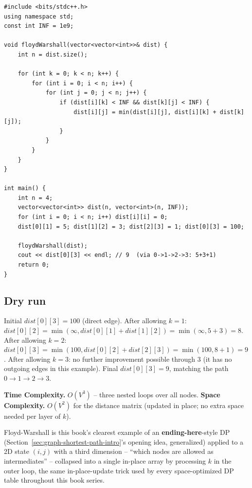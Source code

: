 \begin{lstlisting}
#include <bits/stdc++.h>
using namespace std;
const int INF = 1e9;

void floydWarshall(vector<vector<int>>& dist) {
    int n = dist.size();

    for (int k = 0; k < n; k++) {
        for (int i = 0; i < n; i++) {
            for (int j = 0; j < n; j++) {
                if (dist[i][k] < INF && dist[k][j] < INF) {
                    dist[i][j] = min(dist[i][j], dist[i][k] + dist[k][j]);
                }
            }
        }
    }
}

int main() {
    int n = 4;
    vector<vector<int>> dist(n, vector<int>(n, INF));
    for (int i = 0; i < n; i++) dist[i][i] = 0;
    dist[0][1] = 5; dist[1][2] = 3; dist[2][3] = 1; dist[0][3] = 100;

    floydWarshall(dist);
    cout << dist[0][3] << endl; // 9  (via 0->1->2->3: 5+3+1)
    return 0;
}
\end{lstlisting}

\subsection*{Dry run}


Initial $\textit{dist}[0][3]=100$ (direct edge). After allowing $k=1$:
$\textit{dist}[0][2] = \min(\infty, \textit{dist}[0][1]+\textit{dist}[1][2]) =
\min(\infty,5+3)=8$. After allowing $k=2$: $\textit{dist}[0][3] =
\min(100, \textit{dist}[0][2]+\textit{dist}[2][3]) = \min(100,8+1)=9$.
After allowing $k=3$: no further improvement possible through $3$
(it has no outgoing edges in this example). Final
$\textit{dist}[0][3]=9$, matching the path $0\to1\to2\to3$.

\begin{complexitybox}
\textbf{Time Complexity.} $O(V^3)$ -- three nested loops over all
nodes.
\textbf{Space Complexity.} $O(V^2)$ for the distance matrix (updated
in place; no extra space needed per layer of $k$).
\end{complexitybox}

\begin{takeawaybox}
Floyd-Warshall is this book's clearest example of an
\textbf{ending-here}-style DP (Section~\ref{sec:graph-shortest-path-intro}'s
opening idea, generalized) applied to a 2D state $(i,j)$ with a third
dimension -- ``which nodes are allowed as intermediates'' -- collapsed
into a single in-place array by processing $k$ in the outer loop, the
same in-place-update trick used by every space-optimized DP table
throughout this book series.
\end{takeawaybox}
